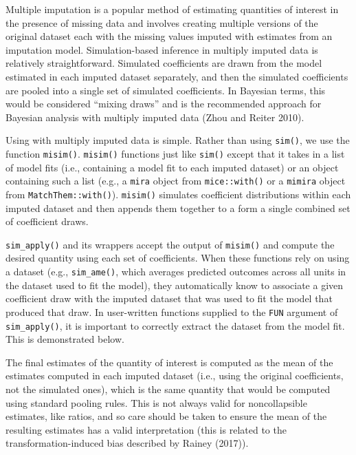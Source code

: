 Multiple imputation is a popular method of estimating quantities of interest in the presence of missing data and involves creating multiple versions of the original dataset each with the missing values imputed with estimates from an imputation model. Simulation-based inference in multiply imputed data is relatively straightforward. Simulated coefficients are drawn from the model estimated in each imputed dataset separately, and then the simulated coefficients are pooled into a single set of simulated coefficients. In Bayesian terms, this would be considered ``mixing draws'' and is the recommended approach for Bayesian analysis with multiply imputed data (Zhou and Reiter 2010).

Using  with multiply imputed data is simple. Rather than using \texttt{sim()}, we use the function \texttt{misim()}. \texttt{misim()} functions just like \texttt{sim()} except that it takes in a list of model fits (i.e., containing a model fit to each imputed dataset) or an object containing such a list (e.g., a \texttt{mira} object from \texttt{mice::with()} or a \texttt{mimira} object from \texttt{MatchThem::with()}). \texttt{misim()} simulates coefficient distributions within each imputed dataset and then appends them together to a form a single combined set of coefficient draws.

\texttt{sim\_apply()} and its wrappers accept the output of \texttt{misim()} and compute the desired quantity using each set of coefficients. When these functions rely on using a dataset (e.g., \texttt{sim\_ame()}, which averages predicted outcomes across all units in the dataset used to fit the model), they automatically know to associate a given coefficient draw with the imputed dataset that was used to fit the model that produced that draw. In user-written functions supplied to the \texttt{FUN} argument of \texttt{sim\_apply()}, it is important to correctly extract the dataset from the model fit. This is demonstrated below.

The final estimates of the quantity of interest is computed as the mean of the estimates computed in each imputed dataset (i.e., using the original coefficients, not the simulated ones), which is the same quantity that would be computed using standard pooling rules. This is not always valid for noncollapsible estimates, like ratios, and so care should be taken to ensure the mean of the resulting estimates has a valid interpretation (this is related to the transformation-induced bias described by Rainey (2017)).

